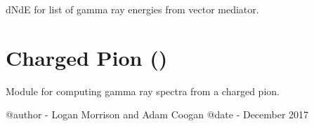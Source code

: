 \documentclass[letterpaper,10pt,english]{sphinxmanual}
\begin{document}
\begin{fulllineitems}
\begin{description}
dNdE for list of gamma ray energies from vector mediator.

\begin{sphinxVerbatim}[commandchars=\\\{\}]
   
     
  
    
\end{sphinxVerbatim}

\end{description}

\end{fulllineitems}



\section{Charged Pion ()}
\label{\detokenize{modules:module-hazma.charged_pion}}\label{\detokenize{modules:charged-pion-hazma-charged-pion}}
Module for computing gamma ray spectra from a charged pion.

@author - Logan Morrison and Adam Coogan
@date - December 2017
\end{document}
